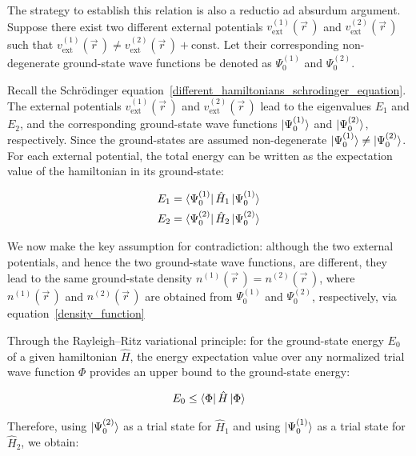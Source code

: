 The strategy to establish this relation is also a reductio ad absurdum argument.
Suppose there exist two different external potentials $v^{(1)}_\mathrm{ext}(\vec{r}\,)$ and $v^{(2)}_\mathrm{ext}(\vec{r}\,)$ such that $v^{(1)}_\mathrm{ext}(\vec{r}\,)\neq v^{(2)}_\mathrm{ext}(\vec{r}\,)+\mathrm{const.}$
Let their corresponding non-degenerate ground-state wave functions be denoted as $\Psi_0^{(1)}$ and $\Psi_0^{(2)}$.

Recall the Schrödinger equation~\eqref{different_hamiltonians_schrodinger_equation}.
The external potentials $v^{(1)}_\mathrm{ext}(\vec{r}\,)$ and $v^{(2)}_\mathrm{ext}(\vec{r}\,)$ lead to the eigenvalues $E_1$ and $E_2$, and the corresponding ground-state wave functions $\ket{\Psi_0^{(1)}}$ and $\ket{\Psi_0^{(2)}}$, respectively.
Since the ground-states are assumed non-degenerate $\ket{\Psi_0^{(1)}}\neq\ket{\Psi_0^{(2)}}$.
For each external potential, the total energy can be written as the expectation value of the hamiltonian in its ground-state:

\begin{equation}
\begin{aligned}
    E_1 &= \bra{\Psi_0^{(1)}}\hat{H}_1\ket{\Psi_0^{(1)}} \\
    E_2 &= \bra{\Psi_0^{(2)}}\hat{H}_2\ket{\Psi_0^{(2)}}
\end{aligned}
\label{different_total_energies}
\end{equation}

We now make the key assumption for contradiction: although the two external potentials, and hence the two ground-state wave functions, are different, they lead to the same ground-state density $n^{(1)}(\vec{r}\,)=n^{(2)}(\vec{r}\,)$, where $n^{(1)}(\vec{r}\,)$ and $n^{(2)}(\vec{r}\,)$ are obtained from $\Psi_0^{(1)}$ and $\Psi_0^{(2)}$, respectively, via equation~\eqref{density_function}

Through the Rayleigh--Ritz variational principle: for the ground-state energy $E_0$ of a given hamiltonian $\hat{H}$, the energy expectation value over any normalized trial wave function $\Phi$ provides an upper bound to the ground-state energy:

\begin{equation}
    E_0\leq \bra{\Phi}\hat{H}\ket{\Phi}
\label{Rayleigh-Ritz_principle}
\end{equation}

Therefore, using $\ket{\Psi_0^{(2)}}$ as a trial state for $\hat{H}_1$ and using $\ket{\Psi_0^{(1)}}$ as a trial state for $\hat{H}_2$, we obtain:

